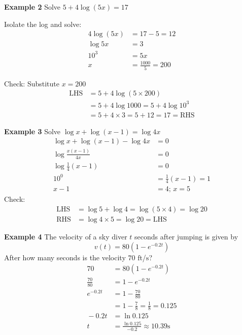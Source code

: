 \textbf{Example 2} Solve $5 +4 \log  \left (5 x\right ) =17$
\begin{multicols}{2}\solution Isolate the log and solve:
\begin{align*}4 \log  \left (5 x\right ) &  = 17 -5 =12 \\
\log  5 x &  = 3 \\
\text{}10^{3} &  = 5 x \\
x &  = \frac{1000}{5} =200\end{align*}

Check: Substitute $x =200$
\begin{align*}\text{LHS} &  = 5 +4 \log  \left (5 \times 200\right ) \\
&  = 5 +4 \log  1000 =5 +4 \log  10^{3} \\
&  = 5 +4 \times 3 =5 +12 =17 =\text{RHS}\end{align*}
\end{multicols}
\clearpage
\begin{multicols}{2}
\textbf{Example 3} Solve $\log  x +\log  \left (x -1\right ) =\log  4 x$\\ \solution
\begin{align*}\log  x +\log  \left (x -1\right ) -\log  4 x &  = 0 \\
\log  \frac{x \left (x -1\right )}{4 x} &  = 0 \\
\log  \frac{1}{4} \left (x -1\right ) &  = 0 \\
\text{}10^{0} &  = \frac{1}{4} \left (x -1\right ) =1 \\
x -1 &  = 4;\, x=5\end{align*}
Check:
\begin{align*}\text{LHS} &  = \log  5 +\log  4 =\log  \left (5 \times 4\right ) =\log  20 \\
\text{RHS} &  = \log  4 \times 5 =\log  20 =\text{LHS}\end{align*}
\columnbreak

\textbf{Example 4} The velocity of a sky diver $t$ seconds after jumping is given by
\begin{equation*}v \left (t\right ) =80 \left (1 -e^{ -0.2 t}\right )
\end{equation*}
After how many seconds is the velocity $70$ $\mbox{ft}$/$\mbox{s}$?\\
\solution\begin{align*}70 &  = 80 \left (1 -e^{ -0.2 t}\right ) \\
\frac{70}{80} &  = 1 -e^{ -0.2 t} \\
e^{ -0.2 t} &  = 1 -\frac{70}{80} \\
&  = 1 -\frac{7}{8} =\frac{1}{8} =0.125 \\
\text{} -0.2 t &  = \ln  0.125 \\
t &  = \frac{\ln  0.125}{ -0.2} \approx 10.39\text{}\mbox{s}\end{align*}
\end{multicols}

